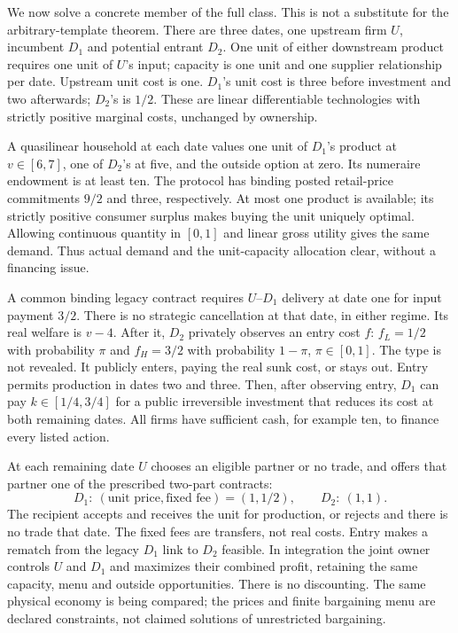 \documentclass[11pt,a4paper]{article}
\numberwithin{equation}{section}
\theoremstyle{definition}
\begin{document}
We now solve a concrete member of the full class. This is not a substitute
for the arbitrary-template theorem. There are three dates, one upstream
firm $U$, incumbent $D_1$ and potential entrant $D_2$. One unit of either
downstream product requires one unit of $U$'s input; capacity is one unit
and one supplier relationship per date. Upstream unit cost is one.
$D_1$'s unit cost is three before investment and two afterwards;
$D_2$'s is $1/2$. These are linear differentiable technologies with
strictly positive marginal costs, unchanged by ownership.

A quasilinear household at each date values one unit of $D_1$'s product
at $v\in[6,7]$, one of $D_2$'s at five, and the outside option at zero.
Its numeraire endowment is at least ten. The protocol has binding posted
retail-price commitments $9/2$ and three, respectively. At most one
product is available; its strictly positive consumer surplus makes buying
the unit uniquely optimal. Allowing continuous quantity in $[0,1]$ and
linear gross utility gives the same demand. Thus actual demand and the
unit-capacity allocation clear, without a financing issue.

A common binding legacy contract requires $U$--$D_1$ delivery at date one
for input payment $3/2$. There is no strategic cancellation at that date,
in either regime. Its real welfare is $v-4$. After it, $D_2$ privately
observes an entry cost $f$: $f_L=1/2$ with probability $\pi$ and
$f_H=3/2$ with probability $1-\pi$, $\pi\in[0,1]$. The type is not
revealed. It publicly enters, paying the real sunk cost, or stays out.
Entry permits production in dates two and three. Then, after observing
entry, $D_1$ can pay $k\in[1/4,3/4]$ for a public irreversible investment
that reduces its cost at both remaining dates. All firms have sufficient
cash, for example ten, to finance every listed action.

At each remaining date $U$ chooses an eligible partner or no trade, and
offers that partner one of the prescribed two-part contracts:
\[
 D_1:\ (\text{unit price},\text{fixed fee})=(1,1/2),\qquad
 D_2:\ (1,1).
\]
The recipient accepts and receives the unit for production, or rejects
and there is no trade that date. The fixed fees are transfers, not real
costs. Entry makes a rematch from the legacy $D_1$ link to $D_2$ feasible.
In integration the joint owner controls $U$ and $D_1$ and maximizes their
combined profit, retaining the same capacity, menu and outside opportunities.
There is no discounting. The same physical economy is being compared;
the prices and finite bargaining menu are declared constraints, not
claimed solutions of unrestricted bargaining.
\end{document}
